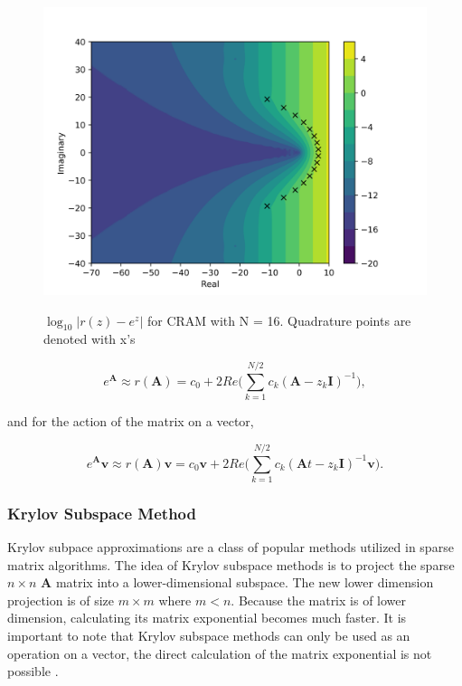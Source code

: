 \begin{figure}[t]
  \centering
  \includegraphics[width=5in]{images/RationApproxCRAMError16.png}\\
  \caption{$\log_{10}|r(z)-e^{z}|$ for CRAM with N = 16. Quadrature points are denoted with x's}
  \label{fig:complexRationalApproxCRAM}
\end{figure} 

\begin{equation}
    e^{\boldsymbol{A}} \approx r(\boldsymbol{A}) = c_{0} + 2Re\Bigg( \sum_{k=1}^{N/2}c_{k}(\boldsymbol{A} - z_{k}\boldsymbol{I})^{-1}\Bigg), 
\end{equation}

\noindent and for the action of the matrix on a vector,

\begin{equation}
    e^{\boldsymbol{A}}\boldsymbol{v} \approx r(\boldsymbol{A})\boldsymbol{v} = c_{0}\boldsymbol{v} + 2Re\Bigg( \sum_{k=1}^{N/2}c_{k}(\boldsymbol{A}t - z_{k}\boldsymbol{I})^{-1}\boldsymbol{v}\Bigg).
    \label{eq:CRAMVector}
\end{equation}




\subsubsection{Krylov Subspace Method}
Krylov subpace approximations are a class of popular methods utilized in sparse matrix algorithms. The idea of Krylov subspace methods is to project the sparse $n \times n$ $\boldsymbol{A}$ matrix into a lower-dimensional subspace. The new lower dimension projection is of size $m \times m$ where $m < n$. Because the matrix is of lower dimension, calculating its matrix exponential becomes much faster. It is important to note that Krylov subspace methods can only be used as an operation on a vector, the direct calculation of the matrix exponential is not possible \cite{saad1992}.  

